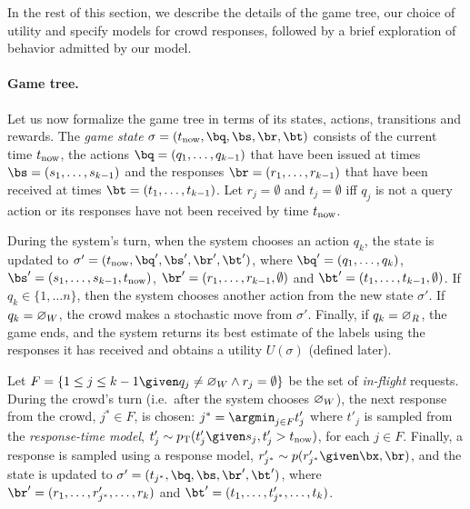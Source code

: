 In the rest of this section, we describe the details of the game tree, our choice of utility and specify models for crowd responses, followed by a brief exploration of behavior admitted by our model.

\paragraph{Game tree.}
Let us now formalize the game tree in terms of its states, actions, transitions and rewards.
The \emph{game state} $\sigma = (\now, \bq, \bs, \br, \bt)$
consists of the current time $t_\text{now}$, the actions $\bq = (q_1, \ldots, q_{k-1})$ that have been issued at times $\bs = (s_1, \ldots, s_{k-1})$ and
the responses $\br = (r_1, \ldots, r_{k-1})$ that have been received at times $\bt = (t_1, \ldots, t_{k-1})$.
Let $r_j = \emptyset$ and $t_j = \emptyset$ iff
$q_j$ is not a query action or
its responses have not been received by time $t_\text{now}$.

During the system's turn,
when the system chooses an action $q_k$,
the state is updated to $\sigma' = (\now, \bq', \bs', \br', \bt')$, where $\bq' = (q_1, \ldots, q_k)$, $\bs' = (s_1, \ldots, s_{k-1}, \now)$, $\br' = (r_1, \ldots, r_{k-1}, \emptyset)$ and $\bt' = (t_1, \ldots, t_{k-1}, \emptyset)$.
If $q_k \in \{1, \ldots n\}$, then the system chooses another action from the new state $\sigma'$.
If $q_k = \varnothing_{W}$, the crowd makes a stochastic move from $\sigma'$.
Finally, if $q_k = \varnothing_{R}$, the game ends, and the system returns its best estimate of the labels using the responses it has received and
obtains a utility $U(\sigma)$ (defined later).

Let $F = \{1 \le j \le k-1 \given q_j \neq \acwait \wedge r_j = \emptyset \}$ be the set of \emph{in-flight} requests.
During the crowd's turn (i.e.\ after the system chooses $\varnothing_{W}$), the next response from the crowd, $j^* \in F$, is chosen: $j^* = \argmin_{j \in F} t'_j$ where $t'_j$ is sampled from the \emph{response-time model}, $t'_j \sim \ptime(t'_j \given s_j, t'_j > \now)$, for each $j \in F$. Finally, a response is sampled using a response model, $r'_{j^*} \sim p(r'_{j^*} \given \bx, \br)$, and the state is updated to $\sigma' = (t_{j^*}, \bq, \bs, \br', \bt')$, where $\br' = (r_1, \ldots, r'_{j^*}, \ldots, r_k)$ and $\bt' = (t_1, \ldots, t'_{j^*}, \ldots, t_k)$.

